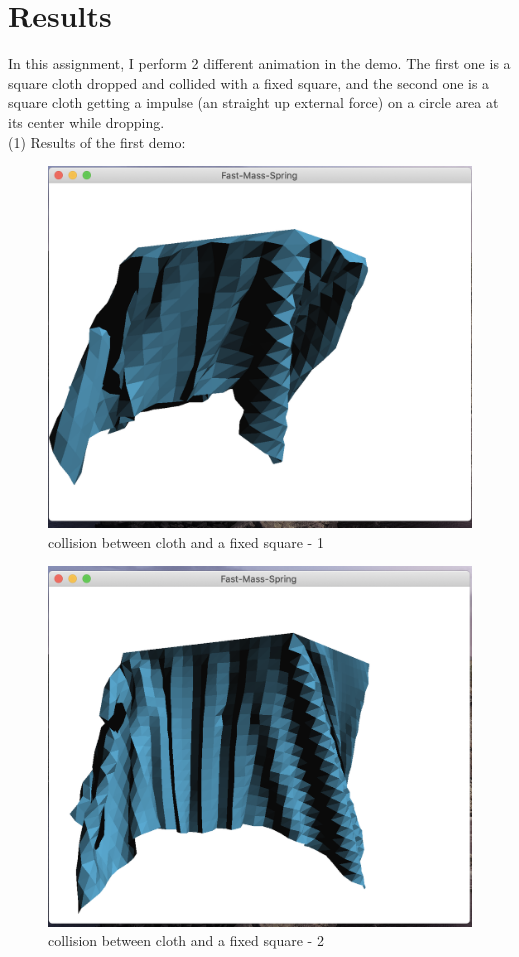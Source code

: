 \documentclass[acmtog]{acmart}
\begin{document}
\section{Results}
In this assignment, I perform 2 different animation in the demo. The first one is 
a square cloth dropped and collided with a fixed square, and the second one is a square
cloth getting a impulse (an straight up external force) on a circle area at its center 
while dropping.\\
(1) Results of the first demo:
\begin{figure}[H]
	\centering
	\includegraphics[scale=0.2]{./square1.png}
	\caption{collision between cloth and a fixed square - 1}
\end{figure}

\begin{figure}[H]
	\centering
	\includegraphics[scale=0.2]{./square2.png}
	\caption{collision between cloth and a fixed square - 2}
\end{figure}
\end{document}

